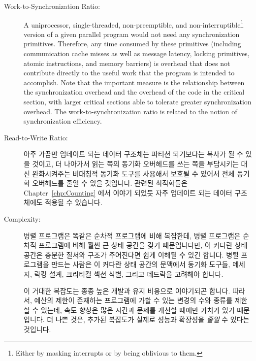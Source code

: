 \begin{description}
\item[Work-to-Synchronization Ratio:]  A uniprocessor,
	single-threaded, non-preemptible, and non-interruptible\footnote{
		Either by masking interrupts or by being oblivious to them.}
	version of a given parallel
	program would not need any synchronization primitives.
	Therefore, any time consumed by these primitives
	(including communication cache misses as well as
	message latency, locking primitives, atomic instructions,
	and memory barriers)
	is overhead that does not contribute directly to the useful
	work that the program is intended to accomplish.
	Note that the important measure is the
	relationship between the synchronization overhead
	and the overhead of the code in the critical section, with larger
	critical sections able to tolerate greater synchronization overhead.
	The work-to-synchronization ratio is related to
	the notion of synchronization efficiency.  %
\fi
\item[Read-to-Write Ratio:]  아주 가끔만 업데이트 되는 데이터 구조체는 파티션
	되기보다는 복사가 될 수 있을 것이고, 더 나아가서 읽는 쪽의 동기화
	오버헤드를 쓰는 쪽을 부담시키는 대신 완화시켜주는 비대칭적 동기화
	도구를 사용해서 보호될 수 있어서 전체 동기화 오버헤드를 줄일 수 있을
	것입니다.
	관련된 최적화들은 Chapter~\ref{chp:Counting} 에서 이야기 되었듯 자주
	업데이트 되는 데이터 구조체에도 적용될 수 있습니다.
\iffalse

\item[Read-to-Write Ratio:]  A data structure that is
	rarely updated may often be replicated rather than partitioned,
	and furthermore may be protected with asymmetric
	synchronization primitives that reduce readers' synchronization
	overhead at the expense of that of writers, thereby
	reducing overall synchronization overhead.
	Corresponding optimizations are possible for frequently
	updated data structures, as discussed in
	Chapter~\ref{chp:Counting}.
\fi
\item[Complexity:]  병렬 프로그램은 똑같은 순차적 프로그램에 비해 복잡한데,
	병렬 프로그램은 순차적 프로그램에 비해 훨씬 큰 상태 공간을 갖기
	때문입니다만, 이 커다란 상태 공간은 충분한 질서와 구조가 주어진다면
	쉽게 이해될 수 있긴 합니다.
	병렬 프로그램을 만드는 사람은 이 커다란 상태 공간의 문맥에서 동기화
	도구들, 메세지, 락킹 설계, 크리티컬 섹션 식별, 그리고 데드락을 고려해야
	합니다.

	이 거대한 복잡도는 종종 높은 개발과 유지 비용으로 이야기되곤 합니다.
	따라서, 예산의 제한이 존재하는 프로그램에 가할 수 있는 변경의 수와
	종류를 제한할 수 있는데, 속도 향상은 많은 시간과 문제를 개선할 때에만
	가치가 있기 때문입니다.
	더 나쁜 것은, 추가된 복잡도가 실제로 성능과 확장성을 \emph{줄일} 수
	있다는 것입니다.


\end{description}
